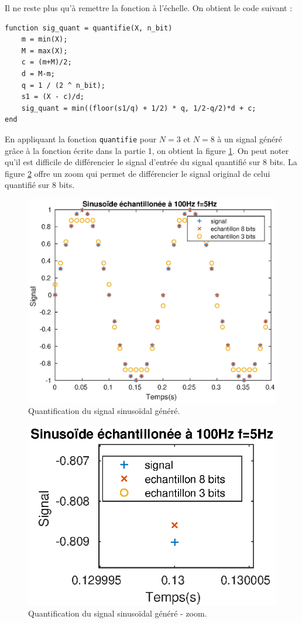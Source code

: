 \documentclass[french]{article}
\begin{document}
Il ne reste plus qu'à remettre la fonction à l'échelle. On obtient le code suivant :

\lstset{language=matlab}
\begin{lstlisting}
function sig_quant = quantifie(X, n_bit)
    m = min(X);
    M = max(X);
    c = (m+M)/2;
    d = M-m;
    q = 1 / (2 ^ n_bit);
    s1 = (X - c)/d;
    sig_quant = min((floor(s1/q) + 1/2) * q, 1/2-q/2)*d + c;
end
\end{lstlisting}
En appliquant la fonction \verb`quantifie` pour $N=3$ et $N=8$ à un signal généré grâce à la fonction écrite dans la partie 1, on obtient la figure \ref{signalBruit}. On peut noter qu'il est difficile de différencier le signal d'entrée du signal quantifié sur 8 bits. La figure \ref{signalBruit2} offre un zoom qui permet de différencier le signal original de celui quantifié sur 8 bits.

\begin{figure}[h!]
\centering
\includegraphics{images/signalBruit.eps}
\caption{Quantification du signal sinusoïdal généré.}
\label{signalBruit}
\end{figure}
\begin{figure}[h!]
	\centering
	\includegraphics{images/signalBruit1.eps}
	\caption{Quantification du signal sinusoïdal généré - zoom.}
	\label{signalBruit2}
\end{figure}
\end{document}
